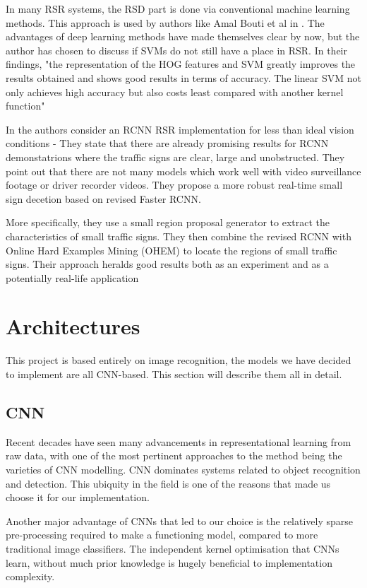 \documentclass[12pt, landscape]{article}
\begin{document}
\begin{multicols}{3}
In many RSR systems, the RSD part is done via conventional machine learning
methods. This approach is used by authors like Amal Bouti et al in
\citep{Recognition1}. The advantages of deep learning methods have made
themselves clear by now, but the author has chosen to discuss if SVMs do not still
have a place in RSR. In their findings, "the representation of the HOG features
and SVM greatly improves the results obtained and shows good results in terms of
accuracy. The linear SVM not only achieves high accuracy but also costs least
compared with another kernel function" \citep[6722 A. Bouti et al]{Recognition1}

In \citep{Han2018} the authors consider an RCNN RSR implementation for less than ideal
vision conditions - They state that there are already promising results for RCNN
demonstatrions where the traffic signs are clear, large and unobstructed. They
point out that there are not many models which work well with video surveillance
footage or driver recorder videos. They propose a more robust real-time small
sign decetion based on revised Faster RCNN.

More specifically, they use a small region proposal generator to extract the
characteristics of small traffic signs. They then combine the revised RCNN with
Online Hard Examples Mining (OHEM) to locate the regions of small traffic signs.
Their approach heralds good results both as an experiment and as a potentially
real-life application

\section{Architectures}
This project is based entirely on image recognition, the models we have decided
to implement are all CNN-based. This section will describe them all in detail.

\subsection{CNN}
Recent decades have seen many advancements in representational learning from raw
data, with one of the most pertinent approaches to the method being the
varieties of CNN modelling. CNN dominates systems related to object recognition
and detection. This ubiquity in the field is one of the reasons that made us
choose it for our implementation.

Another major advantage of CNNs that led to our choice is the relatively sparse
pre-processing required to make a functioning model, compared to more
traditional image classifiers. The independent kernel optimisation that CNNs
learn, without much prior knowledge is hugely beneficial to implementation
complexity.


\end{multicols}
\end{document}
